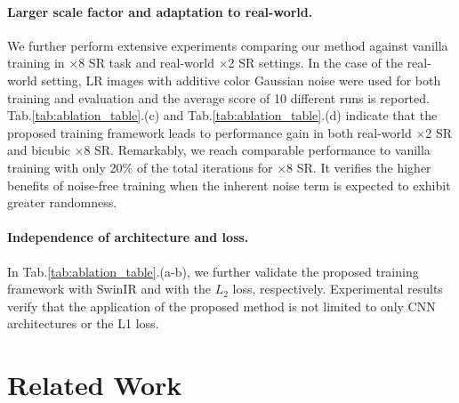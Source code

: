 \documentclass[letterpaper]{article} %
\begin{document}
\paragraph{Larger scale factor and adaptation to real-world.}
We further perform extensive experiments comparing our method against vanilla training in $\times$8 SR task and real-world $\times$2 SR settings.
In the case of the real-world setting, LR images with additive color Gaussian noise were used for both training and evaluation and the average score of 10 different runs is reported.
Tab.\ref{tab:ablation_table}.(c) and Tab.\ref{tab:ablation_table}.(d)
indicate that the proposed training framework leads to performance gain in both real-world $\times$2 SR and bicubic $\times$8 SR. Remarkably, we reach comparable performance to vanilla training with only 20$\%$ of the total iterations for $\times$8 SR. It verifies the higher benefits of noise-free training when the inherent noise term is expected to exhibit greater randomness.


\paragraph{Independence of architecture and loss.}
In Tab.\ref{tab:ablation_table}.(a-b), we further validate the proposed training framework with SwinIR \cite{liang2021swinir} and with the $L_2$ loss, respectively.
Experimental results verify that the application of the proposed method is not limited to only CNN architectures or the L1 loss.








\section{Related Work}
%
\end{document}
